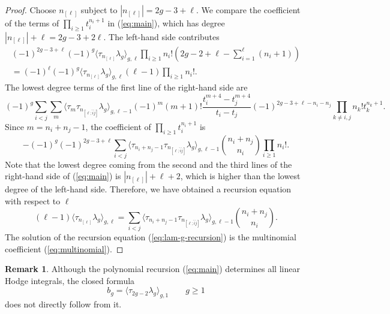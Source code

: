 \documentclass{amsart}
\theoremstyle{definition}
\newtheorem{rem}[thm]{Remark}
\numberwithin{equation}{section}
\numberwithin{figure}{section}
\newcommand{\la}{{\langle}}
\newcommand{\ra}{{\rangle}}
\begin{document}
\begin{proof}
Choose  $n_{[\ell]}$ subject to $|n_{[\ell]}|=2g-3+\ell$. 
We compare the coefficient of  the terms of
 $\prod_{i\ge 1}
t_i ^{n_i+1}$ in (\ref{eq:main}), which has
degree $|n_{[\ell]}|+\ell =2g-3+2\ell$. The left-hand side contributes
\begin{multline*}
(-1)^{2g-3+\ell}(-1)^g
\la\tau_{n_{[\ell]}}\lambda_g\ra_{g,\ell}
\prod_{i\ge 1} n_i!
\left(
2g-2+\ell - \sum_{i=1} ^\ell (n_i+1)
\right)
\\
=
(-1)^{\ell}(-1)^g
\la\tau_{n_{[\ell]}}\lambda_g\ra_{g,\ell}
(\ell-1)
\prod_{i\ge 1}n_i!.
\end{multline*}
The lowest degree terms of the
first line of the right-hand side are
\begin{equation*}
(-1)^g
\sum_{i< j}\sum_m
\la \tau_m\tau_{n_{[\ell;\hat{i}\hat{j}]}}
\lambda_g\ra _{g,\ell-1}
(-1)^{m}(m+1) !
 \frac{  
 t_i ^{m+4}
    -
    t_j^{m+4}}{t_i-t_j}
    (-1)^{2g-3+\ell-n_i-n_j}
    \prod_{k\ne i,j}n_k! t_k ^{n_k+1}.
\end{equation*}
Since $m=n_i+n_j-1$, the coefficient of  $\prod_{i\ge 1}
t_i ^{n_i+1}$ is
\begin{equation*}
-(-1)^g(-1)^{2g-3+\ell}\sum_{i< j}
\la \tau_{n_i+n_j-1}\tau_{n_{[\ell;\hat{i}\hat{j}]}}
\lambda_g\ra _{g,\ell-1}
\binom{n_i+n_j}{n_i}
\prod_{i\ge 1}n_i! .
\end{equation*}
Note that the lowest degree coming from the second and the third
lines of the right-hand side of (\ref{eq:main}) is 
$|n_{[\ell]}|+\ell + 2$, which
is higher than the lowest degree of the left-hand side. 
Therefore, we have 
obtained a recursion equation with respect to $\ell$
\begin{equation}
\label{eq:lam-g-recursion}
(\ell-1)\la \tau_{n_{[\ell]}}\lambda_g \ra_{g,\ell}=
\sum_{i< j}
\la \tau_{n_i+n_j-1}\tau_{n_{[\ell;\hat{i}\hat{j}]}}
\lambda_g\ra _{g,\ell-1}
\binom{n_i+n_j}{n_i}.
\end{equation}
The solution of the recursion equation 
(\ref{eq:lam-g-recursion})
is the multinomial coefficient (\ref{eq:multinomial}).
\end{proof}




\begin{rem}
Although the polynomial recursion 
(\ref{eq:main}) determines all linear Hodge integrals,
the closed formula
$$
b_g = \la \tau_{2g-2}\lambda_g\ra_{g,1}\qquad g\ge 1
$$ 
does not directly follow  from it.
\end{rem}
\end{document}
